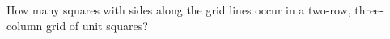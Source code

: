 How many squares with sides along the grid lines occur in a two-row, three-column grid of unit squares?
